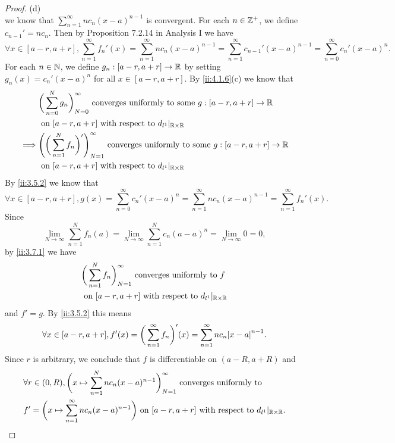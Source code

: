 \begin{proof}{(d)}
\[  \]
  we know that \(\sum_{n = 1}^\infty n c_n (x - a)^{n - 1}\) is convergent.
  For each \(n \in \mathbb{Z}^+\), we define \(c_{n - 1}' = n c_n\).
  Then by Proposition 7.2.14 in Analysis I we have
  \[
    \forall x \in [a - r, a + r], \sum_{n = 1}^\infty f_n'(x) = \sum_{n = 1}^\infty n c_n (x - a)^{n - 1} = \sum_{n = 1}^\infty c_{n - 1}' (x - a)^{n - 1} = \sum_{n = 0}^\infty c_n' (x - a)^n.
  \]
  For each \(n \in \mathbb{N}\), we define \(g_n : [a - r, a + r] \to \mathbb{R}\) by setting \(g_n(x) = c_n' (x - a)^n\) for all \(x \in [a - r, a + r]\).
  By \cref{ii:4.1.6}(c) we know that
  \begin{align*}
             & \bigg(\sum_{n = 0}^N g_n\bigg)_{N = 0}^\infty \text{ converges uniformly to some } g : [a - r, a + r] \to \mathbb{R}              \\
             & \text{ on } [a - r, a + r] \text{ with respect to } d_{l^1}|_{\mathbb{R} \times \mathbb{R}}                                               \\
    \implies & \Bigg(\bigg(\sum_{n = 1}^N f_n\bigg)'\Bigg)_{N = 1}^\infty \text{ converges uniformly to some } g : [a - r, a + r] \to \mathbb{R} \\
             & \text{ on } [a - r, a + r] \text{ with respect to } d_{l^1}|_{\mathbb{R} \times \mathbb{R}}
  \end{align*}
  By \cref{ii:3.5.2} we know that
  \[
    \forall x \in [a - r, a + r], g(x) = \sum_{n = 0}^\infty c_n' (x - a)^n = \sum_{n = 1}^\infty n c_n (x - a)^{n - 1} = \sum_{n = 1}^\infty f_n'(x).
  \]
  Since
  \[
    \lim_{N \to \infty} \sum_{n = 1}^N f_n(a) = \lim_{N \to \infty} \sum_{n = 1}^N c_n (a - a)^n = \lim_{N \to \infty} 0 = 0,
  \]
  by \cref{ii:3.7.1} we have
  \begin{align*}
     & \bigg(\sum_{n = 1}^N f_n\bigg)_{N = 1}^\infty \text{ converges uniformly to } f \\
     & \text{ on } [a - r, a + r] \text{ with respect to } d_{l^1}|_{\mathbb{R} \times \mathbb{R}}
  \end{align*}
  and \(f' = g\).
  By \cref{ii:3.5.2} this means
  \[
    \forall x \in [a - r, a + r], f'(x) = \bigg(\sum_{n = 1}^\infty f_n\bigg)'(x) = \sum_{n = 1}^\infty n c_n \abs{x - a}^{n - 1}.
  \]
  Since \(r\) is arbitrary, we conclude that \(f\) is differentiable on \((a - R, a + R)\) and
  \begin{align*}
     & \forall r \in (0, R), \bigg(x \mapsto \sum_{n = 1}^N n c_n (x - a)^{n - 1}\bigg)_{N = 1}^\infty \text{ converges uniformly to }                   \\
     & f' = \bigg(x \mapsto \sum_{n = 1}^\infty n c_n (x - a)^{n - 1}\bigg) \text{ on } [a - r, a + r] \text{ with respect to } d_{l^1}|_{\mathbb{R} \times \mathbb{R}}.
  \end{align*}
\end{proof}

